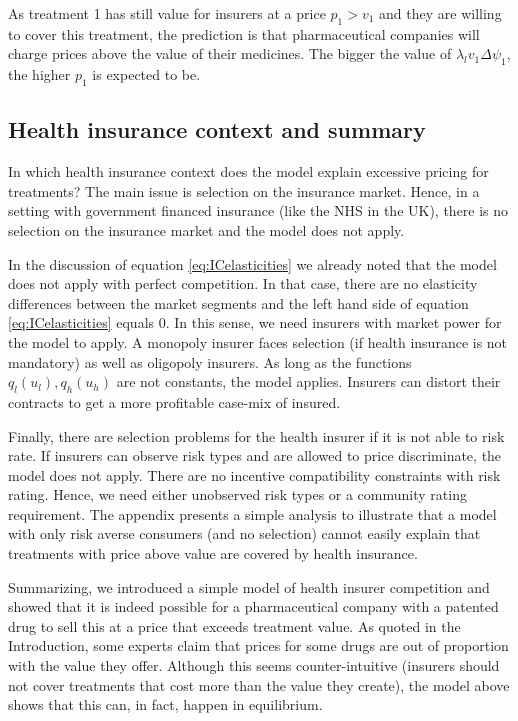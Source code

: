 \documentclass[a4paper,12pt]{article}
\begin{document}
As treatment 1 has still value for insurers at a price \(p_1 > v_1\) and they are willing to cover this treatment, the prediction is that pharmaceutical companies will charge prices above the value of their medicines. The bigger the value of \(\lambda_l v_1 \Delta \psi_1\), the higher \(p_1\) is expected to be.

\subsection{Health insurance context and summary}
\label{sec:org8e563b2}

In which health insurance context does the model explain excessive pricing for treatments? The main issue is selection on the insurance market. Hence, in a setting with government financed insurance (like the NHS in the UK), there is no selection on the insurance market and the model does not apply.

In the discussion of equation \eqref{eq:ICelasticities} we already noted that the model does not apply with perfect competition. In that case, there are no elasticity differences between the market segments and the left hand side of equation \eqref{eq:ICelasticities} equals 0. In this sense, we need insurers with market power for the model to apply. A monopoly insurer faces selection (if health insurance is not mandatory) as well as oligopoly insurers. As long as the functions \(q_l(u_l),q_h(u_h)\) are not constants, the model applies. Insurers can distort their contracts to get a more profitable case-mix of insured. 

Finally, there are selection problems for the health insurer if it is not able to risk rate. If insurers can observe risk types and are allowed to price discriminate, the model does not apply. There are no incentive compatibility constraints with risk rating. Hence, we need either unobserved risk types or a community rating requirement. 
The appendix presents a simple analysis to illustrate that a model with only risk averse consumers (and no selection) cannot easily explain that treatments with price above value are covered by health insurance. 

Summarizing, we introduced a simple model of health insurer competition and showed that it is indeed possible for a pharmaceutical company with a patented drug to sell this at a price that exceeds treatment value. As quoted in the Introduction, some experts claim that prices for some drugs are out of proportion with the value they offer. Although this seems counter-intuitive (insurers should not cover treatments that cost more than the value they create), the model above shows that this can, in fact, happen in equilibrium.
\end{document}

